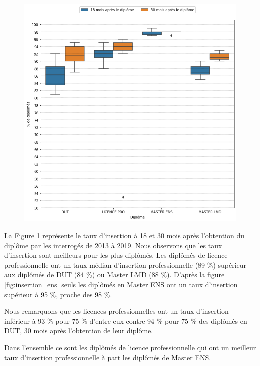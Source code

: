 \documentclass[12pt, a4paper, titlepage, table]{article}
\begin{document}
		\begin{figure}[H]
			\centering
			\includegraphics[width=1\textwidth]{../graphs/boxplot_insertion_diplome.png}
			\label{fig:boxplot_insertion_diplome}
		\end{figure}
	
	
	La Figure \ref{fig:boxplot_insertion_diplome} représente le taux d'insertion à 18 et 30 mois après l'obtention du diplôme par les interrogés de 2013 à 2019. Nous observons que les taux d'insertion sont meilleurs pour les plus diplômés.
	Les diplômés de licence professionnelle ont un taux médian d'insertion professionnelle (89 \%) supérieur aux diplômés de DUT (84 \%) ou Master LMD (88 \%). D'après la figure \ref{fig:insertion_ens} seuls les diplômés en Master ENS ont un taux d'insertion supérieur à 95 \%, proche des 98 \%.
	
	Nous remarquons que les licences professionnelles ont un taux d'insertion inférieur à 93 \% pour 75 \% d'entre eux contre 94 \% pour 75 \% des diplômés en DUT, 30 mois après l'obtention de leur diplôme.
	
	Dans l'ensemble ce sont les diplômés de licence professionnelle qui ont un meilleur taux d'insertion professionnelle à part les diplômés de Master ENS.
	
\end{document}
